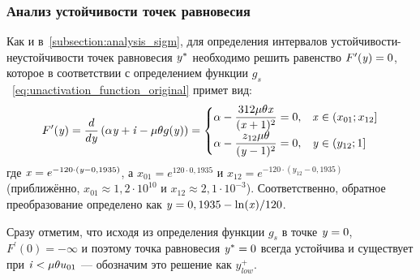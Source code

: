 \subsubsection{Анализ устойчивости точек равновесия}

Как и в~\autoref{subsection:analysis_sigm}, для определения интервалов устойчивости-неустойчивости точек равновесия $\mathit{y}^{*}$ необходимо решить равенство $F^{\prime}(\mathit{y}) = 0$, которое в соответствии с определением функции $g_{s}$~\eqref{eq:unactivation_function_original} примет вид:
\begin{equation}
\nonumber
    F^{\prime}(\mathit{y}) = \dfrac{d}{d\mathit{y}}\left( \alpha \mathit{y} + \mathit{i} - \mu \theta g(\mathit{y}) \right) = 
    \begin{cases}
        \alpha - \dfrac{312 \mu \theta \mathit{x}}{(\mathit{x} + 1)^{2}} = 0,   & \mathit{x} \in \left(x_{01}; x_{12}\right] \\
        \alpha - \dfrac{z_{12} \mu \theta}{(\mathit{y} - 1)^{2}} = 0,           & \mathit{y} \in \left(y_{12}; 1\right] \\
    \end{cases}
\end{equation}
где $\mathit{x} = e^{-120 \cdot (\mathit{y} - 0,1935)}$, а $x_{01} = e^{120 \cdot 0,1935}$ и $x_{12} = e^{-120 \cdot (y_{12} - 0,1935)}$ (приближённо, $x_{01} \approx 1,2 \cdot 10^{10}$ и $x_{12} \approx 2,1 \cdot 10^{-3}$). Соответственно, обратное преобразование определено как $\mathit{y} = 0,1935 - \ln(\mathit{x}) / 120$.

Сразу отметим, что исходя из определения функции $g_{s}$ в точке $\mathit{y} = 0$, $F^{\prime}(0) = -\infty$ и поэтому точка равновесия $\mathit{y}^{*} = 0$ всегда устойчива и существует при $\mathit{i} < \mu \theta u_{01}$ --- обозначим это решение как $y_{low}^{+}$.

